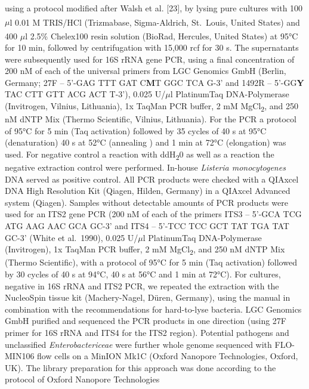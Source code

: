 \documentclass[preprint,3p,
a4paper]{elsarticle} %
\begin{document}
using a protocol modified after Walsh et al. {[}23{]}, by lysing pure
cultures with 100 \(\mu\)l 0.01 M TRIS/HCl
(Trizma\textsuperscript{\textregistered}base, Sigma-Aldrich, St.~Louis,
United States) and 400 \(\mu\)l 2.5\%
Chelex\textsuperscript{\textregistered}100 resin solution (BioRad,
Hercules, United States) at 95°C for 10 min, followed by centrifugation
with 15,000 rcf for 30 s. The supernatants were subsequently used for
16S rRNA gene PCR, using a final concentration of 200 nM of each of the
universal primers from LGC Genomics GmbH (Berlin, Germany; 27F -- 5'-GAG
TTT GAT C\textbf{M}T GGC TCA G-3' and 1492R -- 5'-GG\textbf{Y} TAC CTT
GTT ACG ACT T-3'), 0.025 U/\(\mu\)l Platinum\texttrademark Taq
DNA-Polymerase (Invitrogen\texttrademark, Vilnius, Lithuania), 1x TaqMan
PCR buffer, 2 mM MgCl\textsubscript{2}, and 250 nM dNTP Mix (Thermo
Scientific\texttrademark, Vilnius, Lithuania). For the PCR a protocol of
95°C for 5 min (Taq activation) followed by 35 cycles of 40 s at 95°C
(denaturation) 40 s at 52°C (annealing ) and 1 min at 72°C (elongation)
was used. For negative control a reaction with ddH\textsubscript{2}0 as
well as a reaction the negative extraction control were performed.
In-house \emph{Listeria monocytogenes} DNA served as positive control.
All PCR products were checked with a QIAxcel DNA High Resolution Kit
(Qiagen, Hilden, Germany) in a QIAxcel Advanced system (Qiagen). Samples
without detectable amounts of PCR products were used for an ITS2 gene
PCR (200 nM of each of the primers ITS3 -- 5'-GCA TCG ATG AAG AAC GCA
GC-3' and ITS4 -- 5'-TCC TCC GCT TAT TGA TAT GC-3' (White et al.~1990),
0.025 U/\(\mu\)l Platinum\texttrademark Taq DNA-Polymerase
(Invitrogen\texttrademark), 1x TaqMan PCR buffer, 2 mM
MgCl\textsubscript{2}, and 250 nM dNTP Mix (Thermo
Scientific\texttrademark), with a protocol of 95°C for 5 min (Taq
activation) followed by 30 cycles of 40 s at 94°C, 40 s at 56°C and 1
min at 72°C). For cultures, negative in 16S rRNA and ITS2 PCR, we
repeated the extraction with the NucleoSpin tissue kit (Machery-Nagel,
Düren, Germany), using the manual in combination with the
recommendations for hard-to-lyse bacteria. LGC Genomics GmbH purified
and sequenced the PCR products in one direction (using 27F primer for
16S rRNA and ITS4 for the ITS2 region). Potential pathogens and
unclassified \emph{Enterobactericeae} were further whole genome
sequenced with FLO-MIN106 flow cells on a MinION Mk1C (Oxford Nanopore
Technologies, Oxford, UK). The library preparation for this approach was
done according to the protocol of Oxford Nanopore Technologies
\end{document}
